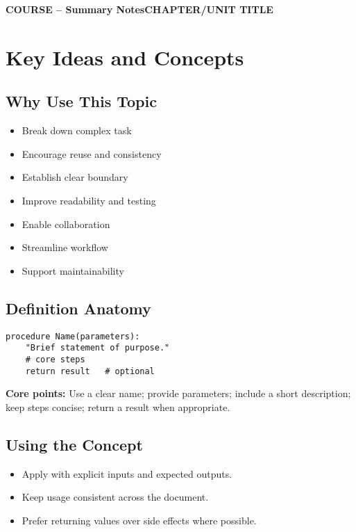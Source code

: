 \documentclass[11pt]{article}
\begin{document}
\begin{flushleft}\small
\textbf{COURSE – Summary Notes}\hfill\textbf{CHAPTER/UNIT TITLE}\\
\hrulefill
\end{flushleft}

\section*{\textcolor{gatororange}{Key Ideas and Concepts}}

\subsection*{Why Use This Topic}
\begin{multicols}{3}
\begin{itemize}
  \item Break down complex task
  \item Encourage reuse and consistency
  \item Establish clear boundary
  \item Improve readability and testing
  \item Enable collaboration
  \item Streamline workflow
  \item Support maintainability
\end{itemize}
\end{multicols}

\subsection*{Definition Anatomy}
\begin{framed}\small
\begin{verbatim}
procedure Name(parameters):
    "Brief statement of purpose."
    # core steps
    return result   # optional
\end{verbatim}
\end{framed}
\textbf{Core points:} Use a clear name; provide parameters; include a short description; keep steps concise; return a result when appropriate.

\subsection*{Using the Concept}
\begin{itemize}\itemsep2pt
  \item Apply with explicit inputs and expected outputs.
  \item Keep usage consistent across the document.
  \item Prefer returning values over side effects where possible.
\end{itemize}
\end{document}
